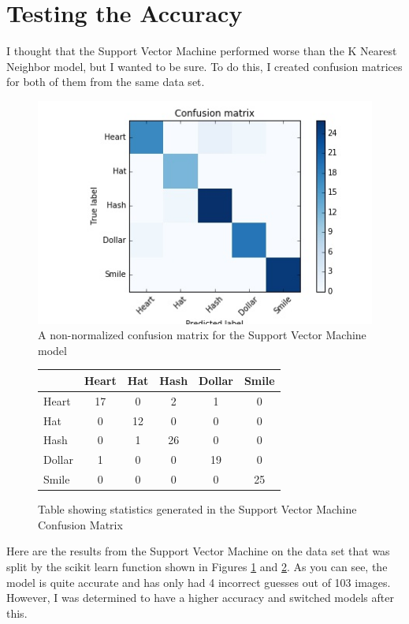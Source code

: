 \documentclass{article}
\begin{document}
\section{Testing the Accuracy}

I thought that the Support Vector Machine performed worse than the K Nearest Neighbor model, but I wanted to be sure. To do this, I created confusion matrices for both of them from the same data set. 

	\begin{figure}[!htb]
		\centering
		\includegraphics[scale=.5]{SVM_CM.jpg}
		\caption{A non-normalized confusion matrix for the Support Vector Machine model}
		\label{SVM_CM}
	\end{figure}	
	
	\begin{figure}[!htb]
		\centering
		\begin{tabular}{|l|c|c|c|c|c|} 
			\hline 
			& Heart & Hat & Hash & Dollar & Smile \\
			\hline
			Heart & 17 & 0 & 2 & 1 & 0 \\
			Hat & 0 & 12 & 0 & 0 & 0 \\
			Hash & 0 & 1 & 26 & 0 & 0 \\
			Dollar & 1 & 0 & 0 & 19 & 0 \\
			Smile & 0 & 0 & 0 & 0 & 25 \\
			\hline
		\end{tabular}
		\caption{Table showing statistics generated in the Support Vector Machine Confusion Matrix}
		\label{SVM_Data}
	\end{figure}
		
	Here are the results from the Support Vector Machine on the data set that was split by the scikit learn function shown in Figures \ref{SVM_CM} and \ref{SVM_Data}. As you can see, the model is quite accurate and has only had 4 incorrect guesses out of 103 images. However, I was determined to have a higher accuracy and switched models after this. 
	
\end{document}
